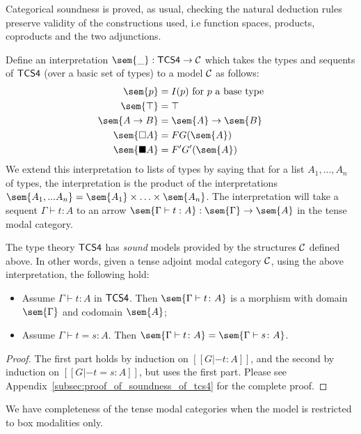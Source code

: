 Categorical soundness is proved, as usual, checking the natural
deduction rules preserve validity of the constructions used, i.e
function spaces, products, coproducts and the two adjunctions.

Define an interpretation $\sem{\_} : \sf{TCS4} \to {\cal C}$ which
takes the types and sequents of $\sf{TCS4}$ (over a basic set of
types) to a model $\cal C$ as follows:
\begin{align*}
\sem{p} &= I(p) \mbox{  for $p$ a base type}\\
\sem{\top} &= \top\\
\sem{  A \to B  } &=  \sem{ A}  \to  \sem{ B }\\
\sem{\Box A} &= F G(\sem{A})\\
\sem{\blacksquare A} &= F' G'(\sem{A})
\end{align*}
 We extend this interpretation to lists of types by saying that for a
 list $A_1, ..., A_n$ of types, the interpretation is the product of
 the interpretations $\sem{A_1,...A_n} = \sem{A_1} \times \ldots
 \times \sem{A_n}$.  The interpretation will take a sequent $\Gamma
 \vdash t : A$ to an arrow $ \sem {\Gamma \vdash t : A} : \sem{
   \Gamma} \to \sem{A} $ in the tense modal category.

\begin{theorem}
\label{thm:tcs4-csound}
The type theory $\sf{TCS4}$ has \textit{sound} models provided by the
structures $\cal C$ defined above.  In other words, given a tense
adjoint modal category $\cal C$, using the above interpretation, the
following hold:
\begin{itemize}
\item Assume $\Gamma \vdash t : A$ in $\sf{TCS4}$. Then $\sem{\Gamma
  \vdash t \colon A}$ is a morphism with domain $\sem{\Gamma}$ and
  codomain $\sem{A}$;
\item Assume $\Gamma \vdash t = s \colon A$. Then $\sem{\Gamma
  \vdash t \colon A} = \sem{\Gamma \vdash s \colon A}$.
\end{itemize}
\end{theorem}
\begin{proof}
  The first part holds by induction on $[[G |- t : A]]$, and the
  second by induction on $[[G |- t = s : A]]$, but uses the first
  part.  Please see Appendix~\ref{subsec:proof_of_soundness_of_tcs4}
  for the complete proof.
\end{proof}

We  have completeness of the tense modal categories when the model is restricted to box modalities only.

